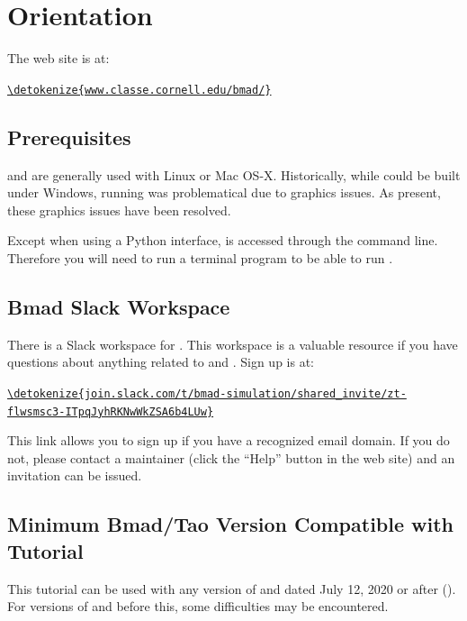 \documentclass{hitec}     %
\newcommand{\Section}[1]{\section{#1}\vspace*{-1ex}}
\newenvironment{display}
  {\vspace*{-1.5ex} \begin{alltt}}
  {\end{alltt} \vspace*{-1.0ex}}
\begin{document}
\newpage

\Section{Orientation}
\label{s:orientation}

The \bmad web site is at:
\begin{display}
  \url{\detokenize{www.classe.cornell.edu/bmad/}}
\end{display}

\subsection{Prerequisites}

\bmad and \tao are generally used with Linux or Mac OS-X. Historically, while \bmad could be built
under Windows, running \tao was problematical due to graphics issues. As present, these graphics issues have
been resolved.

Except when using a Python interface, \tao is accessed through the command line.  Therefore you will
need to run a terminal program to be able to run \tao.

\subsection{Bmad Slack Workspace}

There is a Slack workspace for \bmad. This workspace is a valuable resource if you have
questions about anything related to \bmad and \tao. Sign up is at:
\begin{display}
  \url{\detokenize{join.slack.com/t/bmad-simulation/shared_invite/zt-flwsmsc3-ITpqJyhRKNwWkZSA6b4LUw}}
\end{display}
This link allows you to sign up if you have a recognized email domain. If you do not, please contact
a \bmad maintainer (click the ``Help'' button in the \bmad web site) and an invitation can be
issued.

\subsection{Minimum Bmad/Tao Version Compatible with Tutorial}

This tutorial can be used with any version of \bmad and \tao dated July 12, 2020 or after
(). For versions of \bmad and \tao before this, some difficulties may be
encountered.
\end{document}
